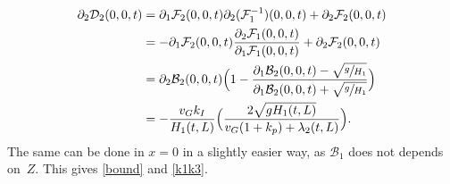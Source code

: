 \begin{equation*}
\begin{split}
\partial_{2}\mathcal{D}_{2}(0,0,t)&=\partial_{1}\mathcal{F}_{2}(0,0,t)\partial_{2}(\mathcal{F}_{1}^{-1})(0,0,t)+\partial_{2}\mathcal{F}_{2}(0,0,t)\\
&=-\partial_{1}\mathcal{F}_{2}(0,0,t)\frac{\partial_{2}\mathcal{F}_{1}(0,0,t)}{\partial_{1}\mathcal{F}_{1}(0,0,t)}+\partial_{2}\mathcal{F}_{2}(0,0,t)\\
&=\partial_{2}\mathcal{B}_{2}(0,0,t)\Bigl(1-\frac{\partial_{1}\mathcal{B}_{2}(0,0,t)-\sqrt{\sfrac{g}{H_{1}}}}{\partial_{1}\mathcal{B}_{2}(0,0,t)+\sqrt{\sfrac{g}{H_{1}}}}\Bigr)\\
&=-\frac{v_{G}k_{I}}{H_{1}(t,L)} \Bigl(\frac{2\sqrt{gH_{1}(t,L)}}{v_{G}(1+k_{p})+\lambda_{2}(t,L)} \Bigr).
\end{split}
\end{equation*}
The same can be done in $x=0$ in a slightly easier way, as $\mathcal{B}_{1}$ does not depends on~$Z$. This gives \eqref{bound} and \eqref{k1k3}.

